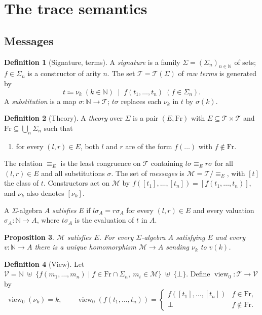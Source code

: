 \documentclass[11pt]{article}
\theoremstyle{definition}
\newtheorem{definition}{Definition}[section]
\theoremstyle{plain}
\newtheorem{proposition}[definition]{Proposition}
\theoremstyle{remark}
\newcommand{\N}{\mathbb{N}}
\newcommand{\Fr}{\mathrm{Fr}}
\newcommand{\view}{\operatorname{view}}
\begin{document}
\section{The trace semantics}\label{sec:trace}

\subsection{Messages}

\begin{definition}[Signature, terms]
A \emph{signature} is a family $\Sigma=(\Sigma_n)_{n\in\N}$ of sets; $f\in\Sigma_n$ is a constructor of arity $n$. The set $\mathcal{T}=\mathcal{T}(\Sigma)$ of \emph{raw terms} is generated by
\[
t \Coloneqq \nu_k \;(k\in\N) \;\mid\; f(t_1,\dots,t_n)\;(f\in\Sigma_n).
\]
A \emph{substitution} is a map $\sigma:\N\to\mathcal{T}$; $t\sigma$ replaces each $\nu_k$ in $t$ by $\sigma(k)$.
\end{definition}

\begin{definition}[Theory]
A \emph{theory} over $\Sigma$ is a pair $(E,\Fr)$ with $E\subseteq\mathcal{T}\times\mathcal{T}$ and $\Fr\subseteq\bigcup_n\Sigma_n$ such that
\begin{enumerate}
\item[(H)] for every $(l,r)\in E$, both $l$ and $r$ are of the form $f(\dots)$ with $f\notin\Fr$.
\end{enumerate}
The relation $\equiv_{E}$ is the least congruence on $\mathcal{T}$ containing $l\sigma\equiv_{E} r\sigma$ for all $(l,r)\in E$ and all substitutions $\sigma$. The set of \emph{messages} is $\mathcal{M}=\mathcal{T}/{\equiv_{E}}$, with $[t]$ the class of $t$. Constructors act on $\mathcal{M}$ by $f([t_1],\dots,[t_n])=[f(t_1,\dots,t_n)]$, and $\nu_k$ also denotes $[\nu_k]$.
\end{definition}

A $\Sigma$-algebra $A$ \emph{satisfies} $E$ if $l\sigma_A=r\sigma_A$ for every $(l,r)\in E$ and every valuation $\sigma_A:\N\to A$, where $t\sigma_A$ is the evaluation of $t$ in $A$.

\begin{proposition}
$\mathcal{M}$ satisfies $E$. For every $\Sigma$-algebra $A$ satisfying $E$ and every $v:\N\to A$ there is a unique homomorphism $\mathcal{M}\to A$ sending $\nu_k$ to $v(k)$.
\end{proposition}

\begin{definition}[View]
Let $\mathcal{V}=\N\;\uplus\;\{f(m_1,\dots,m_n)\mid f\in\Fr\cap\Sigma_n,\ m_i\in\mathcal{M}\}\;\uplus\;\{\bot\}$. Define $\view_0:\mathcal{T}\to\mathcal{V}$ by
\[
\view_0(\nu_k)=k,\qquad
\view_0(f(t_1,\dots,t_n))=
\begin{cases}
f([t_1],\dots,[t_n]) & f\in\Fr,\\
\bot & f\notin\Fr.
\end{cases}
\]
\end{definition}
\end{document}
